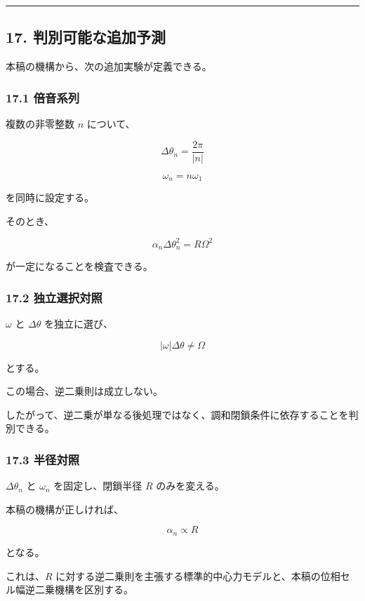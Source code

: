 \documentclass[
  a4paper,
]{ltjsarticle}
\begin{document}
\begin{center}\rule{0.5\linewidth}{0.5pt}\end{center}

\subsection{17.
判別可能な追加予測}\label{ux5224ux5225ux53efux80fdux306aux8ffdux52a0ux4e88ux6e2c}

本稿の機構から、次の追加実験が定義できる。

\subsubsection{17.1 倍音系列}\label{ux500dux97f3ux7cfbux5217}

複数の非零整数 \(n\) について、

\[
\Delta\theta_n=\frac{2\pi}{|n|}
\]

\[
\omega_n=n\omega_1
\]

を同時に設定する。

そのとき、

\[
\alpha_n\Delta\theta_n^2
=R\Omega^2
\]

が一定になることを検査できる。

\subsubsection{17.2
独立選択対照}\label{ux72ecux7acbux9078ux629eux5bfeux7167}

\(\omega\) と \(\Delta\theta\) を独立に選び、

\[
|\omega|\Delta\theta\neq\Omega
\]

とする。

この場合、逆二乗則は成立しない。

したがって、逆二乗が単なる後処理ではなく、調和閉鎖条件に依存することを判別できる。

\subsubsection{17.3 半径対照}\label{ux534aux5f84ux5bfeux7167}

\(\Delta\theta_n\) と \(\omega_n\) を固定し、閉鎖半径 \(R\)
のみを変える。

本稿の機構が正しければ、

\[
\alpha_n\propto R
\]

となる。

これは、\(R\)
に対する逆二乗則を主張する標準的中心力モデルと、本稿の位相セル幅逆二乗機構を区別する。
\end{document}
